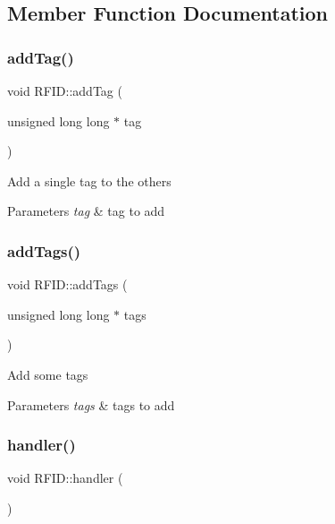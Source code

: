 \subsection{Member Function Documentation}
\mbox{\label{class_r_f_i_d_a0eee010e53dfae9c13cda31ae8cb8a13}} 
\subsubsection{\texorpdfstring{add\+Tag()}{addTag()}}
{\footnotesize\ttfamily void R\+F\+I\+D\+::add\+Tag (\begin{DoxyParamCaption}\item[{unsigned long long $\ast$}]{tag }\end{DoxyParamCaption})}

Add a single tag to the others 
\begin{DoxyParams}{Parameters}
{\em tag} & tag to add \\
\hline
\end{DoxyParams}
\mbox{\label{class_r_f_i_d_a8b8f9db1b91701eaa744f5e39d93b55f}} 
\subsubsection{\texorpdfstring{add\+Tags()}{addTags()}}
{\footnotesize\ttfamily void R\+F\+I\+D\+::add\+Tags (\begin{DoxyParamCaption}\item[{unsigned long long $\ast$}]{tags }\end{DoxyParamCaption})}

Add some tags 
\begin{DoxyParams}{Parameters}
{\em tags} & tags to add \\
\hline
\end{DoxyParams}
\mbox{\label{class_r_f_i_d_aad926c48b528a510b4d34c4019632e09}} 
\subsubsection{\texorpdfstring{handler()}{handler()}}
{\footnotesize\ttfamily void R\+F\+I\+D\+::handler (\begin{DoxyParamCaption}{ }\end{DoxyParamCaption})}

